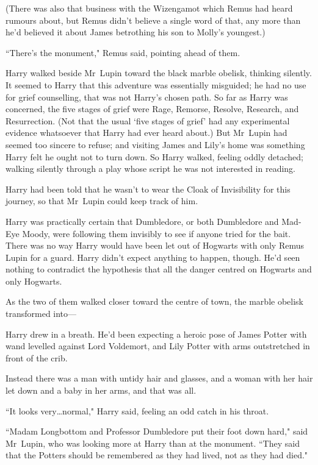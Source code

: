 (There was also that business with the Wizengamot which Remus had heard rumours about, but Remus didn't believe a single word of that, any more than he'd believed it about James betrothing his son to Molly's youngest.)

``There's the monument," Remus said, pointing ahead of them.

\later

Harry walked beside Mr~Lupin toward the black marble obelisk, thinking silently. It seemed to Harry that this adventure was essentially misguided; he had no use for grief counselling, that was not Harry's chosen path. So far as Harry was concerned, the five stages of grief were Rage, Remorse, Resolve, Research, and Resurrection. (Not that the usual `five stages of grief' had any experimental evidence whatsoever that Harry had ever heard about.) But Mr~Lupin had seemed too sincere to refuse; and visiting James and Lily's home was something Harry felt he ought not to turn down. So Harry walked, feeling oddly detached; walking silently through a play whose script he was not interested in reading.

Harry had been told that he wasn't to wear the Cloak of Invisibility for this journey, so that Mr~Lupin could keep track of him.

Harry was practically certain that Dumbledore, or both Dumbledore and Mad-Eye Moody, were following them invisibly to see if anyone tried for the bait. There was no way Harry would have been let out of Hogwarts with only Remus Lupin for a guard. Harry didn't expect anything to happen, though. He'd seen nothing to contradict the hypothesis that all the danger centred on Hogwarts and only Hogwarts.

As the two of them walked closer toward the centre of town, the marble obelisk transformed into—

Harry drew in a breath. He'd been expecting a heroic pose of James Potter with wand levelled against Lord Voldemort, and Lily Potter with arms outstretched in front of the crib.

Instead there was a man with untidy hair and glasses, and a woman with her hair let down and a baby in her arms, and that was all.

``It looks very…normal," Harry said, feeling an odd catch in his throat.

``Madam Longbottom and Professor Dumbledore put their foot down hard," said Mr~Lupin, who was looking more at Harry than at the monument. ``They said that the Potters should be remembered as they had lived, not as they had died."

